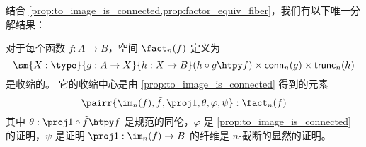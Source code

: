 
结合 \cref{prop:to_image_is_connected,prop:factor_equiv_fiber}，我们有以下唯一分解结果：

\begin{thm}\label{thm:orth-fact}
对于每个函数 $f:A\to B$，空间 $\fact_n(f)$ 定义为
\begin{equation*}
    \sm{X:\type}{g:A\to X}{h:X\to B} (h\circ g\htpy f)\times\mathsf{conn}_n(g)\times\mathsf{trunc}_n(h)
\end{equation*}
是收缩的。
它的收缩中心是由 \cref{prop:to_image_is_connected} 得到的元素
\begin{equation*}
    \pairr{\im_n(f),\tilde{f},\proj1,\theta,\varphi,\psi}:\fact_n(f)
\end{equation*}
其中 $\theta:\proj1\circ\tilde{f}\htpy f$ 是规范的同伦，$\varphi$ 是 \cref{prop:to_image_is_connected} 的证明，$\psi$ 是证明 $\proj1:\im_n(f)\to B$ 的纤维是 $n$-截断的显然的证明。
\end{thm}

